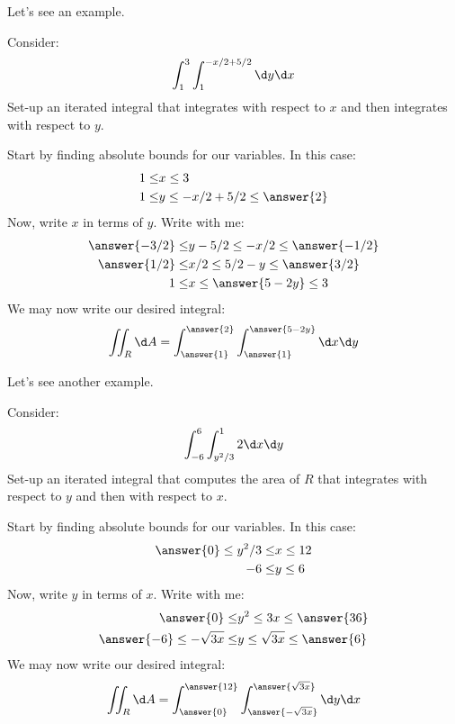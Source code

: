 \documentclass{ximera}
\begin{document}
Let's see an example.

\begin{example}
  Consider:
  \[
  \int_1^3 \int_1^{-x/2 +5/2}\d y \d x
  \]
  Set-up an iterated integral that integrates with respect to $x$ and
  then integrates with respect to $y$.
  \begin{explanation}
    Start by finding absolute bounds for our variables. In this case:
    \begin{align*}
      1\le &x \le 3\\
      1\le &y \le -x/2 + 5/2 \le \answer{2}
    \end{align*}
    Now, write $x$ in terms of $y$. Write with me:
    \begin{align*}
      \answer{-3/2}\le &y -5/2 \le -x/2  \le \answer{-1/2}\\
      \answer{1/2}\le &x/2 \le 5/2-y  \le \answer{3/2}\\
      1\le & x\le \answer{5-2y}  \le 3
    \end{align*}
    We may now write our desired integral:
    \[
    \iint_R \d A = \int_{\answer{1}}^{\answer{2}}\int_{\answer{1}}^{\answer{5-2y}} \d x \d y
    \]
  \end{explanation}
\end{example}

Let's see another example.


\begin{question}
  Consider:
  \[
  \int_{-6}^6 \int_{y^2/3}^12 \d x \d y 
  \]
  Set-up an iterated integral that computes the area of $R$ that
  integrates with respect to $y$ and then with respect to $x$.
  \begin{explanation}
    Start by finding absolute bounds for our variables. In this case:
    \begin{align*}
      \answer{0}\le y^2/3\le &x \le 12\\
      -6\le &y \le 6
    \end{align*}
    Now, write $y$ in terms of $x$. Write with me:
    \begin{align*}
      \answer{0}\le &y^2 \le 3x \le \answer{36}\\
      \answer{-6}\le -\sqrt{3x}\le &y \le \sqrt{3x} \le \answer{6}\\
    \end{align*}
    We may now write our desired integral:
    \[
    \iint_R \d A = \int_{\answer{0}}^{\answer{12}}\int_{\answer{-\sqrt{3x}}}^{\answer{\sqrt{3x}}} \d y \d x
    \]
  \end{explanation}
\end{question}
\end{document}
